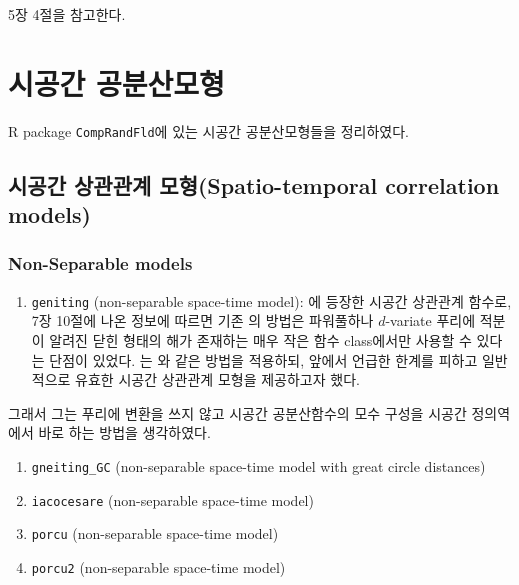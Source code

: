 \documentclass[b5paper,]{scrbook}
\providecommand{\tightlist}{%
  \setlength{\itemsep}{0pt}\setlength{\parskip}{0pt}}
\theoremstyle{plain}
\theoremstyle{definition}
\numberwithin{equation}{section}
\begin{document}
\citep{Montero2015} 5장 4절을 참고한다.

\hypertarget{stcovmodel}{%
\chapter{시공간 공분산모형}\label{stcovmodel}}

R package \texttt{CompRandFld}에 있는 시공간 공분산모형들을 정리하였다.

\hypertarget{--spatio-temporal-correlation-models}{%
\section{시공간 상관관계 모형(Spatio-temporal correlation models)}\label{--spatio-temporal-correlation-models}}

\hypertarget{non-separable-models}{%
\subsection{Non-Separable models}\label{non-separable-models}}

\begin{enumerate}
\def\labelenumi{\arabic{enumi}.}
\tightlist
\item
  \texttt{geniting} (non-separable space-time model): \citep{Gneiting2002}에 등장한 시공간 상관관계 함수로, \citep{Montero2015} 7장 10절에 나온 정보에 따르면 기존 \citep{Cressie1999}의 방법은 파워풀하나 \(d\)-variate 푸리에 적분이 알려진 닫힌 형태의 해가 존재하는 매우 작은 함수 class에서만 사용할 수 있다는 단점이 있었다. \citep{Gneiting2002}는 \citep{Cressie1999}와 같은 방법을 적용하되, 앞에서 언급한 한계를 피하고 일반적으로 유효한 시공간 상관관계 모형을 제공하고자 했다.
\end{enumerate}

그래서 그는 푸리에 변환을 쓰지 않고 시공간 공분산함수의 모수 구성을 시공간 정의역에서 바로 하는 방법을 생각하였다.

\begin{enumerate}
\def\labelenumi{\arabic{enumi}.}
\setcounter{enumi}{1}
\item
  \texttt{gneiting\_GC} (non-separable space-time model with great circle distances)
\item
  \texttt{iacocesare} (non-separable space-time model)
\item
  \texttt{porcu} (non-separable space-time model)
\item
  \texttt{porcu2} (non-separable space-time model)
\end{enumerate}
\end{document}
